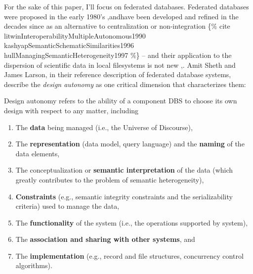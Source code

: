 \documentclass[nohyper]{tufte-book-jls}
\begin{document}
For the sake of this paper, I'll focus on federated databases. Federated
databases were proposed in
the early 1980's \cite{heimbignerFederatedArchitectureInformation1985},andhave been
developed and refined in the decades since as an alternative to
centralization or non-integration \{\% cite
litwinInteroperabilityMultipleAutonomous1990
kashyapSemanticSchematicSimilarities1996
hullManagingSemanticHeterogeneity1997 \%\} -- and their application to
the dispersion of scientific data in local filesystems is not new \cite{busseFederatedInformationSystems1999},.
Amit Sheth and James Larson, in their reference description of federated
database systems, describe the \emph{design autonomy} as one critical
dimension that characterizes them:

\begin{leftbar}
Design autonomy refers to the ability of a component DBS to choose its
own design with respect to any matter, including

\begin{enumerate}
\def\labelenumi{(\alph{enumi})}

\item
  The \textbf{data} being managed (i.e., the Universe of Discourse),
\item
  The \textbf{representation} (data model, query language) and the
  \textbf{naming} of the data elements,
\item
  The conceptualization or \textbf{semantic interpretation} of the data
  (which greatly contributes to the problem of semantic heterogeneity),
\item
  \textbf{Constraints} (e.g., semantic integrity constraints and the
  serializability criteria) used to manage the data,
\item
  The \textbf{functionality} of the system (i.e., the operations
  supported by system),
\item
  The \textbf{association and sharing with other systems}, and
\item
  The \textbf{implementation} (e.g., record and file structures,
  concurrency control algorithms).
\end{enumerate}
\end{leftbar}
\end{document}

